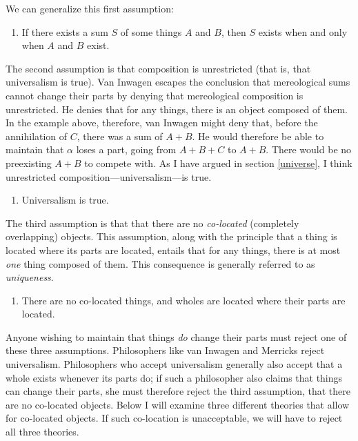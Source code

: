 \documentclass[11pt]{article}
\begin{document}
\begin{spacing}{1.5}
We can generalize this first assumption:

\begin{enumerate}[ref=(\arabic*)]
  \item If there exists a sum $S$ of some things $A$ and $B$, then $S$
    exists when and only when $A$ and $B$ exist. \label{ass-ex}
\end{enumerate}

The second assumption is that composition is unrestricted (that is,
that universalism is true).  Van Inwagen escapes the conclusion that
mereological sums cannot change their parts by denying that
mereological composition is unrestricted.  He denies that for any
things, there is an object composed of them.  In the example above,
therefore, van Inwagen might deny that, before the annihilation of
$C$, there was a sum of $A + B$.  He would therefore be able to
maintain that $\alpha$ loses a part, going from $A + B + C$ to $A +
B$.  There would be no preexisting $A + B$ to compete with.  As I have
argued in section \ref{universe}, I think unrestricted
composition---universalism---is true.

\begin{enumerate}[start=2, ref=(\arabic*)]
  \item Universalism is true. \label{ass-uni}
\end{enumerate}

The third assumption is that that there are no {\em co-located}
(completely overlapping) objects.  This assumption, along with the
principle that a thing is located where its parts are located, entails
that for any things, there is at most {\em one} thing composed of
them.  This consequence is generally referred to as {\em uniqueness}.

\begin{enumerate}[start=3, ref=(\arabic*)]
  \item There are no co-located things, and wholes are located where
    their parts are located. \label{ass-co}
\end{enumerate}

Anyone wishing to maintain that things {\em do} change their parts
must reject one of these three assumptions.  Philosophers like van
Inwagen and Merricks reject universalism.  Philosophers who accept
universalism generally also accept that a whole exists whenever its
parts do; if such a philosopher also claims that things can change
their parts, she must therefore reject the third assumption, that
there are no co-located objects.  Below I will examine three different
theories that allow for co-located objects.  If such co-location is
unacceptable, we will have to reject all three theories.


\end{spacing}
\end{document}
